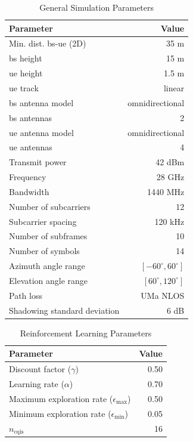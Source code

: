 \begin{table}[!htb]
	\centering
	\caption{General  Simulation Parameters}
	\label{tab:la-sim-params}
	\begin{tabularx}{0.7\columnwidth}{X r}
		\toprule
		\textbf{Parameter} 	& \textbf{Value} \\
		\midrule
		Min. dist. \gls{bs}-\gls{ue} (2D) & 35 m\\
		\gls{bs} height & 15 m\\
		\gls{ue} height & 1.5 m\\
		\gls{ue} track & linear\\
		\gls{bs}  antenna model & omnidirectional \\
		\gls{bs}  antennas & 2 \\
		\gls{ue} antenna model & omnidirectional \\
		\gls{ue} antennas & 4 \\
		Transmit power & 42 dBm\\
		Frequency & 28 GHz\\
		Bandwidth & 1440 MHz\\
		Number of subcarriers  & 12\\
		Subcarrier spacing & 120 kHz\\
		Number of subframes & 10\\
		Number of symbols & 14\\
		Azimuth angle range & $[-60^{\circ}, 60^{\circ}]$\\
		Elevation angle range & $[60^{\circ}, 120^{\circ}]$\\
		Path loss & UMa NLOS\\
		Shadowing standard deviation & 6 dB\\
		\bottomrule
	\end{tabularx}
\end{table}



\begin{table}[!htb]
	\centering
	\caption{Reinforcement Learning Parameters}
	\label{tab:la-rl-params}
	\begin{tabularx}{0.6\columnwidth}{X r}
		\toprule
		\textbf{Parameter} 	 & \textbf{Value} \\
		\midrule
		Discount factor ($\gamma$)  & 0.50\\
		Learning rate ($\alpha$) & 0.70\\
		Maximum exploration rate ($\epsilon_{\max}$) & 0.50\\
		Minimum exploration rate ($\epsilon_{\min}$) & 0.05\\
		$n_{\text{cqis}}$ & 16 \\
		\bottomrule
	\end{tabularx}
\end{table}

